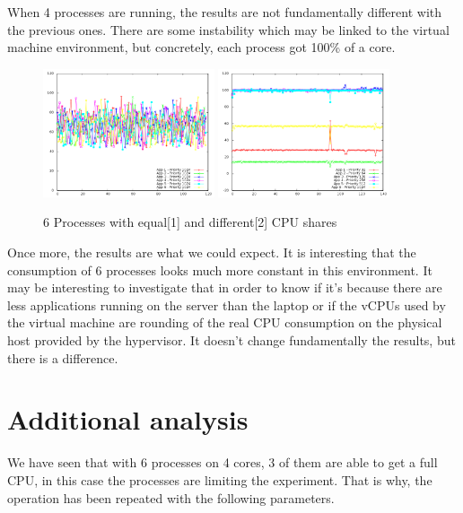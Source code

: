When 4 processes are running, the results are not fundamentally different with
the previous ones. There are some instability which may be linked to the virtual
machine environment, but concretely, each process got 100\% of a core.

\begin{figure}[h!]
\begin{center}
	\includegraphics[width=0.45\textwidth]{./Images/CpuMonitor/vm/6_equalshares.png}
	\includegraphics[width=0.45\textwidth]{./Images/CpuMonitor/vm/6_differentshares.png}
	\caption{6 Processes with equal[1] and different[2] CPU shares}
\end{center}
\end{figure}

Once more, the results are what we could expect. It is interesting that the
consumption of 6 processes looks much more constant in this environment. It
may be interesting to investigate that in order to know if it's because there
are less applications running on the server than the laptop or if the vCPUs used
by the virtual machine are rounding of the real CPU consumption on the physical
host provided by the hypervisor. It doesn't change fundamentally the results,
but there is a difference.

\section{Additional analysis}

We have seen that with 6 processes on 4 cores, 3 of them are able to get a full
CPU, in this case the processes are limiting the experiment. That is why, the 
operation has been repeated with the following parameters.

